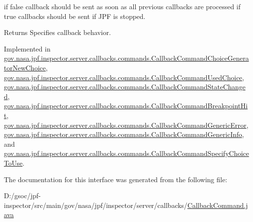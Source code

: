 if false callback should be sent as soon as all previous callbacks are processed if true callbacks should be sent if J\+PF is stopped. 

\begin{DoxyReturn}{Returns}
Specifies callback behavior. 
\end{DoxyReturn}


Implemented in \hyperlink{classgov_1_1nasa_1_1jpf_1_1inspector_1_1server_1_1callbacks_1_1commands_1_1_callback_command_choice_generator_new_choice_a64ae39788c0bd6cc54f9d7b039534b8c}{gov.\+nasa.\+jpf.\+inspector.\+server.\+callbacks.\+commands.\+Callback\+Command\+Choice\+Generator\+New\+Choice}, \hyperlink{classgov_1_1nasa_1_1jpf_1_1inspector_1_1server_1_1callbacks_1_1commands_1_1_callback_command_used_choice_ac9f4c3b7073de17dad9eb1487e471983}{gov.\+nasa.\+jpf.\+inspector.\+server.\+callbacks.\+commands.\+Callback\+Command\+Used\+Choice}, \hyperlink{classgov_1_1nasa_1_1jpf_1_1inspector_1_1server_1_1callbacks_1_1commands_1_1_callback_command_state_changed_a7e6e83514e98395c3b1a63265980967d}{gov.\+nasa.\+jpf.\+inspector.\+server.\+callbacks.\+commands.\+Callback\+Command\+State\+Changed}, \hyperlink{classgov_1_1nasa_1_1jpf_1_1inspector_1_1server_1_1callbacks_1_1commands_1_1_callback_command_breakpoint_hit_a29df60af9ac0b70c256fd4e6274b8bf0}{gov.\+nasa.\+jpf.\+inspector.\+server.\+callbacks.\+commands.\+Callback\+Command\+Breakpoint\+Hit}, \hyperlink{classgov_1_1nasa_1_1jpf_1_1inspector_1_1server_1_1callbacks_1_1commands_1_1_callback_command_generic_error_a7480e70e3fdb3a61db7f915fc7e9f47c}{gov.\+nasa.\+jpf.\+inspector.\+server.\+callbacks.\+commands.\+Callback\+Command\+Generic\+Error}, \hyperlink{classgov_1_1nasa_1_1jpf_1_1inspector_1_1server_1_1callbacks_1_1commands_1_1_callback_command_generic_info_a64bcc2fce69378fd551d98a25b0dd734}{gov.\+nasa.\+jpf.\+inspector.\+server.\+callbacks.\+commands.\+Callback\+Command\+Generic\+Info}, and \hyperlink{classgov_1_1nasa_1_1jpf_1_1inspector_1_1server_1_1callbacks_1_1commands_1_1_callback_command_specify_choice_to_use_ad8864c40e6d457618ef1f0e67727dadf}{gov.\+nasa.\+jpf.\+inspector.\+server.\+callbacks.\+commands.\+Callback\+Command\+Specify\+Choice\+To\+Use}.



The documentation for this interface was generated from the following file\+:\begin{DoxyCompactItemize}
\item 
D\+:/gsoc/jpf-\/inspector/src/main/gov/nasa/jpf/inspector/server/callbacks/\hyperlink{_callback_command_8java}{Callback\+Command.\+java}\end{DoxyCompactItemize}
